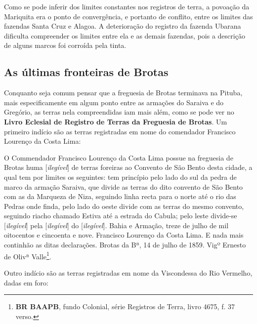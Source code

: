 Como se pode inferir dos limites constantes nos registros de terra, a povoação da Mariquita era o ponto de convergência, e portanto de conflito, entre os limites das fazendas Santa Cruz e Alagoa. A deterioração do registro da fazenda Ubarana dificulta compreender os limites entre ela e as demais fazendas, pois a descrição de alguns marcos foi corroída pela tinta.

\subsection{As últimas fronteiras de Brotas}

Conquanto seja comum pensar que a freguesia de Brotas terminava na Pituba, mais especificamente em algum ponto entre as armações do Saraiva e do Gregório, as terras nela compreendidas iam mais além, como se pode ver no \textbf{Livro Eclesial de Registro de Terras da Freguesia de Brotas}. Um primeiro indício são as terras registradas em nome do comendador Francisco Lourenço da Costa Lima:

\begin{citacao}
O Commendador Francisco Lourenço da Costa Lima possue na freguesia de Brotas huma [\textit{ilegível}] de terras foreiras ao Convento de São Bento desta cidade, a qual tem por limites os seguintes: tem princípio pelo lado do sul da pedra de marco da armação Saraiva, que divide as terras do dito convento de São Bento com as da Marqueza de Niza, seguindo linha recta para o norte até o rio das Pedras onde finda, pelo lado do oeste divide com as terras do mesmo convento, seguindo riacho chamado Estiva até a estrada do Cabula; pelo leste divide-se [\textit{ilegível}] pela [\textit{ilegível}] do [\textit{ilegível}]. Bahia e Armação, treze de julho de mil oitocentos e cincoenta e nove. Francisco Lourenço da Costa Lima. E nada mais continhão as ditas declarações. Brotas da Bª, 14 de julho de 1859. Vigº Ernesto de Olivª Valle\footnote{\textbf{BR BAAPB}, fundo Colonial, série Registros de Terra, livro 4675, f. 37 verso.}.
\end{citacao}

Outro indício são as terras registradas em nome da Viscondessa do Rio Vermelho, dadas em foro:


